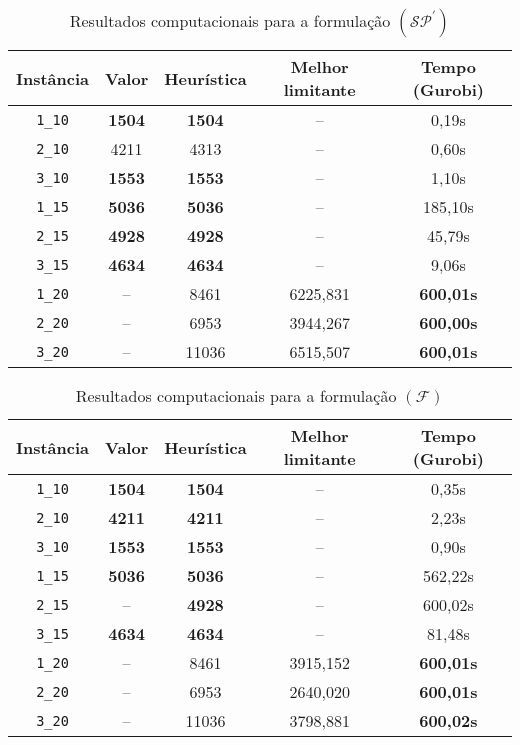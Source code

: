 \documentclass{article}
\begin{document}
\begin{table}[ht]
    \centering
    \begin{tabular}{c|c|c|c|c}
        Instância   & Valor      & Heurística & Melhor limitante & Tempo (Gurobi) \\
        \hline
        {\tt 1\_10} & {\bf 1504} & {\bf 1504} & --               & 0,19s          \\
        {\tt 2\_10} & 4211       & 4313       & --               & 0,60s          \\
        {\tt 3\_10} & {\bf 1553} & {\bf 1553} & --               & 1,10s          \\
        \hline
        {\tt 1\_15} & {\bf 5036} & {\bf 5036} & --               & 185,10s        \\
        {\tt 2\_15} & {\bf 4928} & {\bf 4928} & --               & 45,79s         \\
        {\tt 3\_15} & {\bf 4634} & {\bf 4634} & --               & 9,06s          \\
        \hline
        {\tt 1\_20} & --         & 8461       & 6225,831         & {\bf 600,01s}  \\
        {\tt 2\_20} & --         & 6953       & 3944,267         & {\bf 600,00s}  \\
        {\tt 3\_20} & --         & 11036      & 6515,507         & {\bf 600,01s}
    \end{tabular}
    \caption{Resultados computacionais para a formulação $(\mathcal{SP}^\prime)$}
    \label{tab:computational-results}
\end{table}

\begin{table}[ht]
    \centering
    \begin{tabular}{c|c|c|c|c}
        Instância   & Valor      & Heurística & Melhor limitante & Tempo (Gurobi) \\
        \hline
        {\tt 1\_10} & {\bf 1504} & {\bf 1504} & --               & 0,35s          \\
        {\tt 2\_10} & {\bf 4211} & {\bf 4211}       & --               & 2,23s          \\
        {\tt 3\_10} & {\bf 1553} & {\bf 1553} & --               & 0,90s          \\
        \hline
        {\tt 1\_15} & {\bf 5036} & {\bf 5036} & --               & 562,22s        \\
        {\tt 2\_15} & --         & {\bf 4928} & --               & 600,02s        \\
        {\tt 3\_15} & {\bf 4634} & {\bf 4634} & --               & 81,48s         \\
        \hline
        {\tt 1\_20} & --         & 8461       & 3915,152         & {\bf 600,01s}  \\
        {\tt 2\_20} & --         & 6953       & 2640,020         & {\bf 600,01s}  \\
        {\tt 3\_20} & --         & 11036      & 3798,881         & {\bf 600,02s}
    \end{tabular}
    \caption{Resultados computacionais para a formulação $(\mathcal{F})$}
    \label{tab:computational-results-flow}
\end{table}
\end{document}
